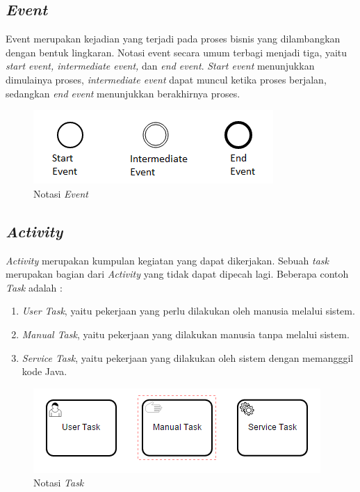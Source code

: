 \subsection{\textit{Event}}
\label{sec:event}
Event merupakan kejadian yang terjadi pada proses bisnis yang dilambangkan dengan bentuk lingkaran. Notasi event secara umum terbagi menjadi tiga, yaitu \textit{start event, intermediate event,} dan \textit{end event}. \textit{Start event} menunjukkan dimulainya proses, \textit{intermediate event} dapat muncul ketika proses berjalan, sedangkan \textit{end event} menunjukkan berakhirnya proses.  
\begin{figure}[H]
	\centering
	\includegraphics[scale=1]{Gambar/Bab-2/bpmn/event1}
	\caption{Notasi \textit{Event}} 
	\label{event}
\end{figure}

\subsection{\textit{Activity}}
\label{sec:activity}
\textit{Activity} merupakan kumpulan kegiatan yang dapat dikerjakan. Sebuah \textit{task} merupakan bagian dari \textit{Activity} yang tidak dapat dipecah lagi. Beberapa contoh \textit{Task} adalah :
	\begin{enumerate}
		\item{\textit{User Task}}, yaitu pekerjaan yang perlu dilakukan oleh manusia melalui sistem.
		\item{\textit{Manual Task}}, yaitu pekerjaan yang dilakukan manusia tanpa melalui sistem.
		\item{\textit{Service Task}}, yaitu pekerjaan yang dilakukan oleh sistem dengan memangggil kode Java. 
	\end{enumerate}
	
\begin{figure}[H]
	\centering
	\includegraphics[scale=1]{Gambar/Bab-2/bpmn/task}
	\caption{Notasi \textit{Task}} 
	\label{task}
\end{figure}

